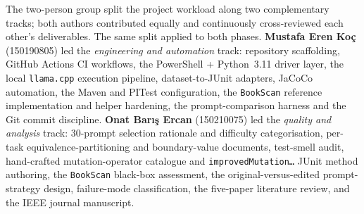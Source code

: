 \documentclass[journal]{IEEEtran}
\begin{document}
The two-person group split the project workload along two complementary
tracks; both authors contributed equally and continuously cross-reviewed
each other's deliverables. The same split applied to both phases.
\textbf{Mustafa Eren Ko\c{c}} (150190805) led the \emph{engineering and
automation} track: repository scaffolding, GitHub Actions CI workflows,
the PowerShell + Python~3.11 driver layer, the local \texttt{llama.cpp}
execution pipeline, dataset-to-JUnit adapters, JaCoCo automation, the
Maven and PITest configuration, the \texttt{BookScan} reference
implementation and helper hardening, the prompt-comparison harness and
the Git commit discipline. \textbf{Onat Bar{\i}\c{s} Ercan} (150210075)
led the \emph{quality and analysis} track: 30-prompt selection rationale
and difficulty categorisation, per-task equivalence-partitioning and
boundary-value documents, test-smell audit, hand-crafted mutation-operator
catalogue and \texttt{improvedMutation\ldots} JUnit method authoring, the
\texttt{BookScan} black-box assessment, the original-versus-edited
prompt-strategy design, failure-mode classification, the five-paper
literature review, and the IEEE journal manuscript.
\end{document}
